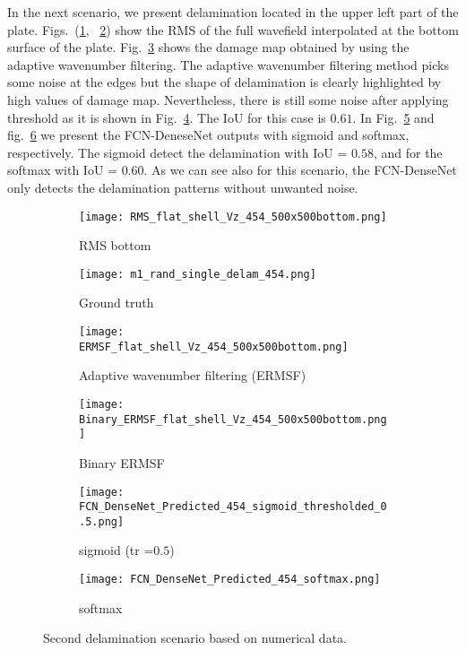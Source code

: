 In the next scenario, we present delamination located in the upper left part of the plate.
Figs.~(\ref{fig:dispersion30deg_direct}, ~\ref{fig:m1_rand_single_delam_454}) show the RMS of the full wavefield interpolated at the bottom surface of the plate.
Fig.~\ref{fig:ERMSF_flat_shell_Vz_454} shows the damage map obtained by using the adaptive wavenumber filtering.
The adaptive wavenumber filtering method picks some noise at the edges but the shape of delamination is clearly highlighted by high values of damage map.
Nevertheless, there is still some noise after applying threshold as it is shown in Fig.~\ref{fig:Binary_ERMSF}.
The IoU for this case is \(0.61\).
In Fig.~\ref{fig:predict_454_sigmoid_tr_0.5} and fig.~\ref{fig:predict_454_softmax} we present the FCN-DeneseNet outputs with sigmoid and softmax, respectively.
The sigmoid detect the delamination with IoU = \(0.58\), and for the softmax with IoU = \(0.60\).
As we can see also for this scenario, the FCN-DenseNet only detects the delamination patterns without unwanted noise.
	\begin{figure} [!h]
		\centering
		\begin{subfigure}[b]{0.47\textwidth}
			\centering
			\texttt{[image: RMS\_flat\_shell\_Vz\_454\_500x500bottom.png]}
			\caption{RMS bottom}
			\label{fig:dispersion30deg_direct}
		\end{subfigure}
		\hfill
		\begin{subfigure}[b]{0.47\textwidth}
			\centering
			\texttt{[image: m1\_rand\_single\_delam\_454.png]}
			\caption{Ground truth}
			\label{fig:m1_rand_single_delam_454}
		\end{subfigure}
		\hfill
		\begin{subfigure}[b]{0.47\textwidth}
			\centering
			\texttt{[image: ERMSF\_flat\_shell\_Vz\_454\_500x500bottom.png]}
			\caption{Adaptive wavenumber filtering (ERMSF)}
			\label{fig:ERMSF_flat_shell_Vz_454}
		\end{subfigure}
		\hfill
		\begin{subfigure}[b]{0.47\textwidth}
			\centering
			\texttt{[image: Binary\_ERMSF\_flat\_shell\_Vz\_454\_500x500bottom.png]}
			\caption{Binary ERMSF}
			\label{fig:Binary_ERMSF}
		\end{subfigure}
		\hfill
		\begin{subfigure}[b]{0.47\textwidth}
			\centering
			\texttt{[image: FCN\_DenseNet\_Predicted\_454\_sigmoid\_thresholded\_0.5.png]}
			\caption{sigmoid (tr =\(0.5\))}
			\label{fig:predict_454_sigmoid_tr_0.5}
		\end{subfigure}
		\hfill	
		\begin{subfigure}[b]{0.47\textwidth}
			\centering
			\texttt{[image: FCN\_DenseNet\_Predicted\_454\_softmax.png]}
			\caption{softmax}
			\label{fig:predict_454_softmax}
		\end{subfigure}
		\caption{Second delamination scenario based on numerical data.}
		\label{fig:RMS454}
	\end{figure} 
